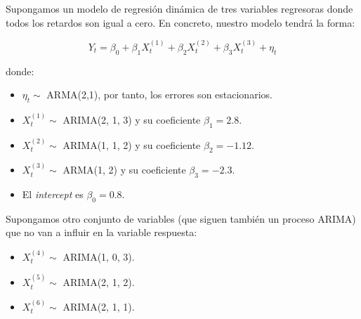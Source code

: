 \documentclass[
  12pt,
  a4paper]{article}
\providecommand{\tightlist}{%
  \setlength{\itemsep}{0pt}\setlength{\parskip}{0pt}}
\begin{document}
Supongamos un modelo de regresión dinámica de tres variables regresoras
donde todos los retardos son igual a cero. En concreto, nuestro modelo
tendrá la forma:

\begin{equation}\label{eq:ejemplo1}
    Y_t = \beta_0 + \beta_1 X_t^{(1)} + \beta_2 X_t^{(2)} + \beta_3 X_t^{(3)} + \eta_t
\end{equation}

donde:

\begin{itemize}
\tightlist
\item
  \(\eta_t \sim\) ARMA(2,1), por tanto, los errores son estacionarios.
\item
  \(X_t^{(1)} \sim\) ARIMA(2, 1, 3) y su coeficiente \(\beta_1 = 2.8\).
\item
  \(X_t^{(2)} \sim\) ARIMA(1, 1, 2) y su coeficiente
  \(\beta_2 = -1.12\).
\item
  \(X_t^{(3)} \sim\) ARMA(1, 2) y su coeficiente \(\beta_3 = -2.3\).
\item
  El \emph{intercept} es \(\beta_0=0.8\).
\end{itemize}

Supongamos otro conjunto de variables (que siguen también un proceso
ARIMA) que no van a influir en la variable respuesta:

\begin{itemize}
\tightlist
\item
  \(X_t^{(4)} \sim\) ARIMA(1, 0, 3).
\item
  \(X_t^{(5)} \sim\) ARIMA(2, 1, 2).
\item
  \(X_t^{(6)} \sim\) ARIMA(2, 1, 1).
\end{itemize}
\end{document}
